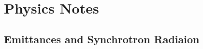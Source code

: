 \documentclass{book}
\begin{document}
\part{Physics Notes}

\chapter{Emittances and Synchrotron Radiaion}



\begin{theindex}


\end{theindex}
\end{document}
